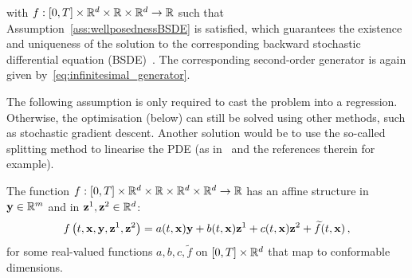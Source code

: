 with $f:[0,T]\times \mathbb{R}^d \times \mathbb{R} \times \mathbb{R}^{d} \rightarrow \mathbb{R}$ 
such that Assumption~\ref{ass:wellposednessBSDE} is satisfied, which guarantees the existence and uniqueness of the solution to the corresponding backward stochastic differential equation (BSDE)~\cite[Section 4]{Pardoux1990AdaptedEquation}.
The corresponding second-order generator is again given by~\eqref{eq:infinitesimal_generator}.

The following assumption is only required to cast the problem into a regression. 
Otherwise, the optimisation (below) can still be solved using other methods, such as stochastic gradient descent. Another solution would be to use the so-called splitting method to linearise the PDE (as in~\cite{Beck2021DeepPDEs} and the references therein for example).

\begin{assumption}\label{ass:faffine}
The function $f:[0,T]\times \mathbb{R}^d \times \mathbb{R} \times \mathbb{R}^{d}\times\mathbb{R}^{d} \rightarrow \mathbb{R}$ has an affine structure in $\mathbf{y} \in \mathbb{R}^m$ and in $\mathbf{z}^1,\mathbf{z}^2 \in \mathbb{R}^{d}$:
$$
f\left(t, \mathbf{x}, \mathbf{y}, \mathbf{z}^1, \mathbf{z}^2\right)
= a(t,\mathbf{x})\mathbf{y} + b(t, \mathbf{x})\mathbf{z}^1 + c(t, \mathbf{x}) \mathbf{z}^2 + \widetilde{f}(t, \mathbf{x})\,,
$$
for some real-valued functions $a,b,c,\widetilde{f}$ on $[0,T]\times\mathbb{R}^d$ that map to conformable dimensions. 
\end{assumption}


